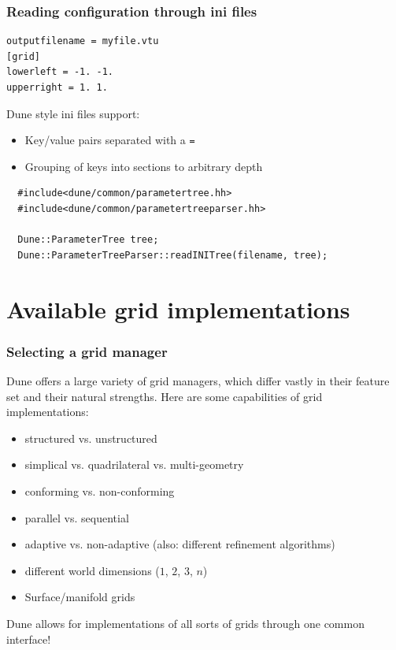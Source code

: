 \documentclass[ignorenonframetext,11pt]{beamer}
\theoremstyle{definition}
\begin{document}
\begin{frame}[fragile]
 \frametitle{Reading configuration through ini files}
\begin{lstlisting}
outputfilename = myfile.vtu
[grid]
lowerleft = -1. -1.
upperright = 1. 1.
\end{lstlisting}
\vspace{0.5cm}
 Dune style ini files support:
 \begin{itemize}
  \item Key/value pairs separated with a \verb!=!
  \item Grouping of keys into sections to arbitrary depth
 \end{itemize}

 \begin{lstlisting}
  #include<dune/common/parametertree.hh>
  #include<dune/common/parametertreeparser.hh>

  Dune::ParameterTree tree;
  Dune::ParameterTreeParser::readINITree(filename, tree);
 \end{lstlisting}

\end{frame}

\section{Available grid implementations}

\begin{frame}
 \frametitle{Selecting a grid manager}

 Dune offers a large variety of grid managers, which differ vastly in their feature set and their natural strengths.
 Here are some capabilities of grid implementations:
 \begin{itemize}
  \item structured vs. unstructured
  \item simplical vs. quadrilateral vs. multi-geometry
  \item conforming vs. non-conforming
  \item parallel vs. sequential
  \item adaptive vs. non-adaptive (also: different refinement algorithms)
  \item different world dimensions ($1$, $2$, $3$, $n$)
  \item Surface/manifold grids
 \end{itemize}

 Dune allows for implementations of all sorts of grids through one common interface!
\end{frame}
\end{document}
